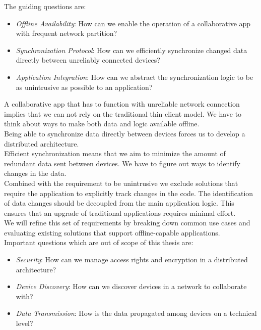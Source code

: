 The guiding questions are:
\begin{itemize}
\item \emph{Offline Availability}: How can we enable the operation of a collaborative app with frequent network partition?
\item \emph{Synchronization Protocol}: How can we efficiently synchronize changed data directly between unreliably connected devices?
\item \emph{Application Integration}: How can we abstract the synchronization logic to be as unintrusive as possible to an application?\\
\end{itemize}

A collaborative app that has to function with unreliable network connection implies that we can not rely on the traditional thin client model.
We have to think about ways to make both data and logic available offline.\\

Being able to synchronize data directly between devices forces us to develop a distributed architecture.\\

Efficient synchronization means that we aim to minimize the amount of redundant data sent between devices.
We have to figure out ways to identify changes in the data.\\

Combined with the requirement to be unintrusive we exclude solutions that require the application to explicitly track changes in the code.
The identification of data changes should be decoupled from the main application logic.
This ensures that an upgrade of traditional applications requires minimal effort.\\

We will refine this set of requirements by breaking down common use cases and evaluating existing solutions that support offline-capable applications.\\

Important questions which are out of scope of this thesis are:

\begin{itemize}
\item \emph{Security}: How can we manage access rights and encryption in a distributed architecture?
\item \emph{Device Discovery}: How can we discover devices in a network to collaborate with?
\item \emph{Data Transmission}: How is the data propagated among devices on a technical level?
\end{itemize}

